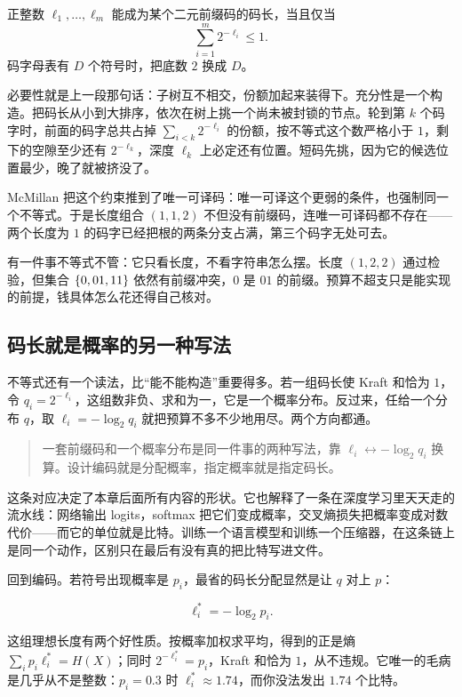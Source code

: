 \begin{theorem}
正整数 \(\ell_1,\dots,\ell_m\) 能成为某个二元前缀码的码长，当且仅当
\[
\sum_{i=1}^m 2^{-\ell_i}\le 1.
\]
码字母表有 \(D\) 个符号时，把底数 \(2\) 换成 \(D\)。
\end{theorem}

必要性就是上一段那句话：子树互不相交，份额加起来装得下。充分性是一个构造。把码长从小到大排序，依次在树上挑一个尚未被封锁的节点。轮到第 \(k\) 个码字时，前面的码字总共占掉 \(\sum_{i<k}2^{-\ell_i}\) 的份额，按不等式这个数严格小于 \(1\)，剩下的空隙至少还有 \(2^{-\ell_k}\)，深度 \(\ell_k\) 上必定还有位置。短码先挑，因为它的候选位置最少，晚了就被挤没了。

McMillan 把这个约束推到了唯一可译码：唯一可译这个更弱的条件，也强制同一个不等式。于是长度组合 \((1,1,2)\) 不但没有前缀码，连唯一可译码都不存在——两个长度为 \(1\) 的码字已经把根的两条分支占满，第三个码字无处可去。

有一件事不等式不管：它只看长度，不看字符串怎么摆。长度 \((1,2,2)\) 通过检验，但集合 \(\left\{0,01,11\right\}\) 依然有前缀冲突，\(0\) 是 \(01\) 的前缀。预算不超支只是能实现的前提，钱具体怎么花还得自己核对。

\subsection{码长就是概率的另一种写法}

不等式还有一个读法，比``能不能构造''重要得多。若一组码长使 Kraft 和恰为 \(1\)，令 \(q_i=2^{-\ell_i}\)，这组数非负、求和为一，它是一个概率分布。反过来，任给一个分布 \(q\)，取 \(\ell_i=-\log_2 q_i\) 就把预算不多不少地用尽。两个方向都通。

\begin{quote}
一套前缀码和一个概率分布是同一件事的两种写法，靠 \(\ell_i\leftrightarrow-\log_2 q_i\) 换算。设计编码就是分配概率，指定概率就是指定码长。
\end{quote}

这条对应决定了本章后面所有内容的形状。它也解释了一条在深度学习里天天走的流水线：网络输出 logits，softmax 把它们变成概率，交叉熵损失把概率变成对数代价——而它的单位就是比特。训练一个语言模型和训练一个压缩器，在这条链上是同一个动作，区别只在最后有没有真的把比特写进文件。

回到编码。若符号出现概率是 \(p_i\)，最省的码长分配显然是让 \(q\) 对上 \(p\)：

\[
\ell_i^{*}=-\log_2 p_i.
\]

这组理想长度有两个好性质。按概率加权求平均，得到的正是熵 \(\sum_i p_i\ell_i^{*}=H(X)\)；同时 \(2^{-\ell_i^{*}}=p_i\)，Kraft 和恰为 \(1\)，从不违规。它唯一的毛病是几乎从不是整数：\(p_i=0.3\) 时 \(\ell_i^{*}\approx1.74\)，而你没法发出 \(1.74\) 个比特。

